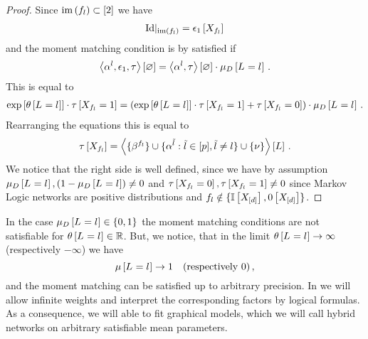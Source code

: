 \begin{proof}
    Since $\mathrm{im}\left(f_{l}\right)\subset[2]$ we have
    \begin{align*}
        {\mathrm{Id}}|_{\mathrm{im}\left(f_{l}\right)} = \epsilon_{1}\left[X_{f_{l}}\right]
    \end{align*}
    and the moment matching condition is by  satisfied if
    \begin{align*}
        \left\langle \alpha^{l}, \epsilon_{1}, \tau\right\rangle \left[ \varnothing \right]
        = \left\langle \alpha^{l},\tau\right\rangle \left[ \varnothing \right] \cdot \mu_{D}\left[L_{}=l_{}\right] \, .
    \end{align*}
    This is equal to
    \begin{align*}
        \mathrm{exp}\left[\theta\left[L_{}=l_{}\right]\right] \cdot \tau\left[X_{f_{l}}=1\right]
        = \left( \mathrm{exp}\left[\theta\left[L_{}=l_{}\right]\right] \cdot \tau\left[X_{f_{l}}=1\right] + \tau\left[X_{f_{l}}=0\right] \right) \cdot \mu_{D}\left[L_{}=l_{}\right] \, .
    \end{align*}
    Rearranging the equations this is equal to
    \begin{align*}
        \tau\left[X_{f_{l}}\right]
        = \left\langle \{\beta^{f_{l}}\}
        \cup\{\alpha^{\tilde{l}} : \tilde{l} \in [p], \tilde{l}\neq l\}
        \cup\{\nu\}\right\rangle \left[ L \right] \, .
    \end{align*}
    We notice that the right side is well defined, since we have by assumption $\mu_{D}\left[L_{}=l_{}\right], (1- \mu_{D}\left[L_{}=l_{}\right]) \neq 0$ and $\tau\left[X_{f_{l}}=0\right], \tau\left[X_{f_{l}}=1\right] \neq 0$ since Markov Logic networks are positive distributions and $f_{l} \notin \{\mathbb{I}\left[X_{[d]}\right],0\left[X_{[d]}\right]\}$.
\end{proof}


In the case $\mu_{D}\left[L_{}=l_{}\right]\in\{0,1\}$ the moment matching conditions are not satisfiable for $\theta\left[L_{}=l_{}\right]\in\mathbb{R}$.
But, we notice, that in the limit $\theta\left[L_{}=l_{}\right]\rightarrow \infty $ (respectively $-\infty$) we have
\[ \mu\left[L_{}=l_{}\right] \rightarrow  1 \quad \text{(respectively $0$)}\, ,  \]
and the moment matching can be satisfied up to arbitrary precision.
In  we will allow infinite weights and interpret the corresponding factors by logical formulas.
As a consequence, we will able to fit graphical models, which we will call hybrid networks on arbitrary satisfiable mean parameters.

